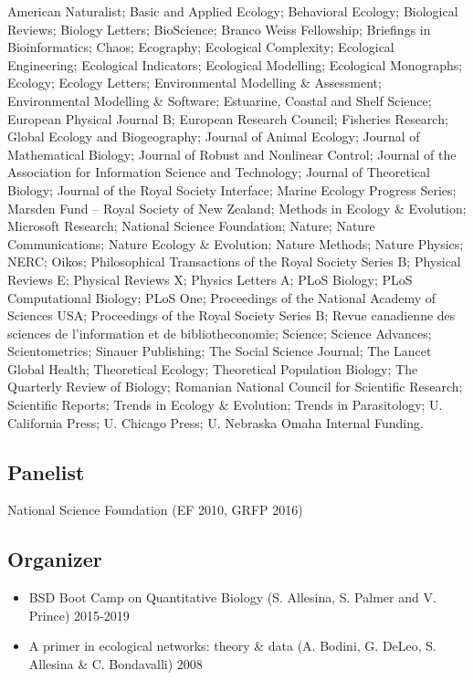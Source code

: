 \documentclass[10,letter,]{awesome-cv}
\providecommand{\tightlist}{%
	\setlength{\itemsep}{0pt}\setlength{\parskip}{0pt}}
\begin{document}
American Naturalist; Basic and Applied Ecology; Behavioral Ecology;
Biological Reviews; Biology Letters; BioScience; Branco Weiss
Fellowship; Briefings in Bioinformatics; Chaos; Ecography; Ecological
Complexity; Ecological Engineering; Ecological Indicators; Ecological
Modelling; Ecological Monographs; Ecology; Ecology Letters;
Environmental Modelling \& Assessment; Environmental Modelling \&
Software; Estuarine, Coastal and Shelf Science; European Physical
Journal B; European Research Council; Fisheries Research; Global Ecology
and Biogeography; Journal of Animal Ecology; Journal of Mathematical
Biology; Journal of Robust and Nonlinear Control; Journal of the
Association for Information Science and Technology; Journal of
Theoretical Biology; Journal of the Royal Society Interface; Marine
Ecology Progress Series; Marsden Fund -- Royal Society of New Zealand;
Methods in Ecology \& Evolution; Microsoft Research; National Science
Foundation; Nature; Nature Communications; Nature Ecology \& Evolution;
Nature Methods; Nature Physics; NERC; Oikos; Philosophical Transactions
of the Royal Society Series B; Physical Reviews E; Physical Reviews X;
Physics Letters A; PLoS Biology; PLoS Computational Biology; PLoS One;
Proceedings of the National Academy of Sciences USA; Proceedings of the
Royal Society Series B; Revue canadienne des sciences de l'information
et de bibliotheconomie; Science; Science Advances; Scientometrics;
Sinauer Publishing; The Social Science Journal; The Lancet Global
Health; Theoretical Ecology; Theoretical Population Biology; The
Quarterly Review of Biology; Romanian National Council for Scientific
Research; Scientific Reports; Trends in Ecology \& Evolution; Trends in
Parasitology; U. California Press; U. Chicago Press; U. Nebraska Omaha
Internal Funding.

\hypertarget{panelist}{%
\subsection{Panelist}\label{panelist}}

National Science Foundation (EF 2010, GRFP 2016)

\hypertarget{organizer}{%
\subsection{Organizer}\label{organizer}}

\begin{itemize}
\tightlist
\item
  BSD Boot Camp on Quantitative Biology (S. Allesina, S. Palmer and V.
  Prince) 2015-2019
\item
  A primer in ecological networks: theory \& data (A. Bodini, G. DeLeo,
  S. Allesina \& C. Bondavalli) 2008
\end{itemize}
\end{document}
